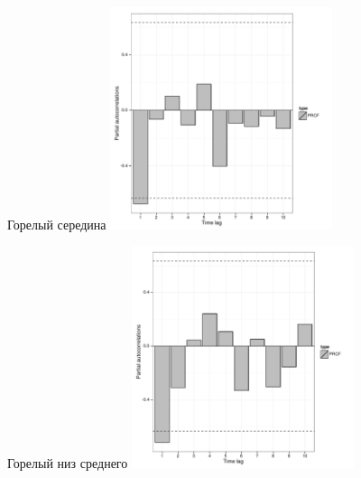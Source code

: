 \documentclass[12pt, a4paper]{disser}
\begin{document}
\begin{figure}[ht]
	\begin{minipage}[b]{.46\linewidth}
	\begin{center}
	{\tiny Горелый середина}
	\includegraphics[width=65mm]{../White_Sea/dynamic_N_N1/PRCF_Goreliy_middle_.pdf}
	\end{center}
	\end{minipage}
%
	\hfil %
%
	\begin{minipage}[b]{.46\linewidth}
	\begin{center}	
	{\tiny Горелый низ среднего}
	\includegraphics[width=65mm]{../White_Sea/dynamic_N_N1/PRCF_Goreliy_midlow_.pdf}
	\end{center}
	\end{minipage}



\end{figure}
\end{document}
